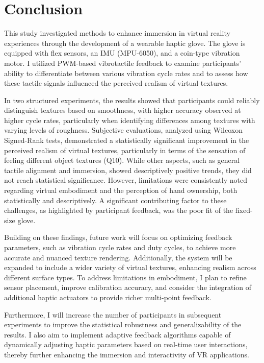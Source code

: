 \chapter{Conclusion} %

\label{Chapter6}

This study investigated methods to enhance immersion in virtual reality experiences through the development of a wearable haptic glove. The glove is equipped with flex sensors, an IMU (MPU-6050), and a coin-type vibration motor. I utilized PWM-based vibrotactile feedback to examine participants' ability to differentiate between various vibration cycle rates and to assess how these tactile signals influenced the perceived realism of virtual textures.

In two structured experiments, the results showed that participants could reliably distinguish textures based on smoothness, with higher accuracy observed at higher cycle rates, particularly when identifying differences among textures with varying levels of roughness. Subjective evaluations, analyzed using Wilcoxon Signed-Rank tests, demonstrated a statistically significant improvement in the perceived realism of virtual textures, particularly in terms of the sensation of feeling different object textures (Q10). While other aspects, such as general tactile alignment and immersion, showed descriptively positive trends, they did not reach statistical significance. However, limitations were consistently noted regarding virtual embodiment and the perception of hand ownership, both statistically and descriptively. A significant contributing factor to these challenges, as highlighted by participant feedback, was the poor fit of the fixed-size glove.

Building on these findings, future work will focus on optimizing feedback parameters, such as vibration cycle rates and duty cycles, to achieve more accurate and nuanced texture rendering. Additionally, the system will be expanded to include a wider variety of virtual textures, enhancing realism across different surface types. To address limitations in embodiment, I plan to refine sensor placement, improve calibration accuracy, and consider the integration of additional haptic actuators to provide richer multi-point feedback. 

Furthermore, I will increase the number of participants in subsequent experiments to improve the statistical robustness and generalizability of the results. I also aim to implement adaptive feedback algorithms capable of dynamically adjusting haptic parameters based on real-time user interactions, thereby further enhancing the immersion and interactivity of VR applications.





